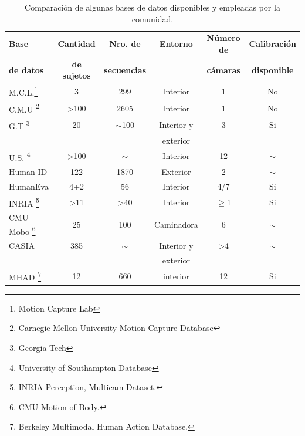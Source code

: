 \begin{table}[h!]
	\centering	
	\caption{Comparación de algunas bases de datos disponibles y empleadas por la comunidad.}
	\label{bases_relevadas}
	\begin{minipage}{\textwidth} %
	\begin{tabular}{||l|ccccc||} 
\hline
\rowcolor[HTML]{CBCEFB} 

\textbf{Base}     & \textbf{Cantidad }  & \textbf{Nro. de }   & \textbf{Entorno} & \textbf{Número de} & \textbf{Calibración}\\
\rowcolor[HTML]{CBCEFB} 
\textbf{de datos} & \textbf{de sujetos} & \textbf{secuencias} &         & \textbf{cámaras }  &  \textbf{disponible} \\


\hline \hline
M.C.L.\footnote{Motion Capture Lab}  & 3 		& 		299	   & Interior&     1    &    No      \\ \hline
C.M.U  \footnote{Carnegie Mellon University Motion Capture Database}	
 & >100     &       2605   & Interior&      1   &    No       \\ \hline
G.T \footnote{Georgia Tech} &       20    & $\sim$100           & Interior y &   3      &  Si       \\ 
	 &		 &					 & exterior        &         &    \\ \hline
U.S. \footnote{University of Southampton Database} &       >100    &     $\sim$       & Interior &   12      &  $\sim$      \\ \hline
Human ID  &     122    & 1870           & Exterior &   2      &$\sim$       \\ \hline
HumanEva &     4+2    & 56           & Interior &   4/7      &  Si       \\ \hline
INRIA \footnote{INRIA Perception, Multicam Dataset. } &       >11    & >40           & Interior &   $\geq$1      &  Si       \\ \hline
CMU Mobo \footnote{CMU Motion of Body.} &     25    & 100           & Caminadora &   6      &  $\sim$       \\ \hline
CASIA &     385    & $\sim$           & Interior y  &   >4      &  $\sim$       \\ 
&         &            & exterior  &         &      \\ \hline
MHAD \footnote{Berkeley Multimodal Human Action Database.} & 12         & 660            & interior  & 12        & Si      \\ 
\hline \hline



\end{tabular}
\end{minipage}
\end{table}
